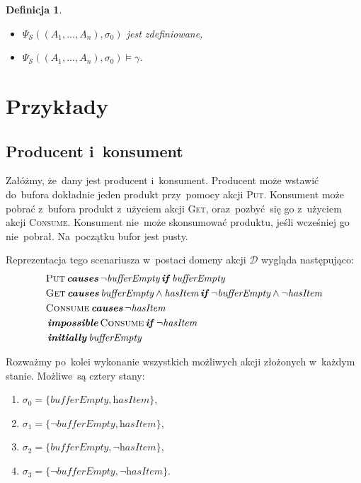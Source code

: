 \documentclass[11pt,a4paper]{article}
\newtheorem{defn}{Definicja}
\DeclareMathOperator{\Initially}{\textbf{\textit{initially}}}
\DeclareMathOperator{\Causes}{\textbf{\textit{causes}}}
\DeclareMathOperator{\If}{\textbf{\textit{if}}}
\DeclareMathOperator{\Impossible}{\textbf{\textit{impossible}}}
\begin{document}
\begin{defn}
\begin{enumerate}
        \begin{itemize}
            \item $\Psi_\mathcal{S}((A_1,...,A_n),\sigma_{0})$ jest zdefiniowane,
            \item $\Psi_\mathcal{S}((A_1,...,A_n),\sigma_{0}) \models \gamma$.
        \end{itemize}
    \end{enumerate}
\end{defn}

\section{Przykłady}

\subsection{Producent i~konsument}
\label{subsec:producer-consumer-example}

Załóżmy, że~dany jest producent i~konsument.
Producent może wstawić do~bufora dokładnie jeden produkt przy~pomocy akcji \textsc{Put}.
Konsument może pobrać z~bufora produkt z~użyciem akcji \textsc{Get},
oraz~pozbyć~się go z~użyciem akcji \textsc{Consume}.
Konsument nie~może skonsumować produktu, jeśli wcześniej go nie~pobrał.
Na~początku bufor jest pusty.

Reprezentacja tego scenariusza w~postaci domeny akcji $\mathcal{D}$ wygląda następująco:
\begin{align*}
    & \textsc{Put} \Causes \neg \textit{bufferEmpty} \If \textit{bufferEmpty} \\
    & \textsc{Get} \Causes \textit{bufferEmpty} \land \textit{hasItem} \If \neg \textit{bufferEmpty} \land \neg \textit{hasItem} \\
    & \textsc{Consume} \Causes \neg \textit{hasItem} \\
    & \Impossible \textsc{Consume} \If \neg \textit{hasItem} \\
    & \Initially \textit{bufferEmpty}
\end{align*}

Rozważmy po~kolei wykonanie wszystkich możliwych akcji złożonych w~każdym stanie. Możliwe~są cztery stany:

\begin{enumerate}
    \item $\sigma_0 = \{ \textit{bufferEmpty}, \textit{hasItem} \}$,
    \item $\sigma_1 = \{ \neg \textit{bufferEmpty}, \textit{hasItem} \}$,
    \item $\sigma_2 = \{ \textit{bufferEmpty}, \neg \textit{hasItem} \}$,
    \item $\sigma_3 = \{ \neg \textit{bufferEmpty}, \neg \textit{hasItem} \}$.
\end{enumerate}
\end{document}
